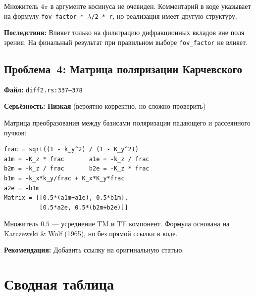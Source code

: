 \documentclass[12pt,a4paper]{article}
\begin{document}
Множитель $4\pi$ в аргументе косинуса не очевиден. Комментарий в коде
указывает на формулу \texttt{fov\_factor * $\lambda$/2 * r}, но реализация
имеет другую структуру.

\textbf{Последствия:} Влияет только на фильтрацию дифракционных вкладов
вне поля зрения. На финальный результат при правильном выборе \texttt{fov\_factor}
не влияет.

\subsection{Проблема~4: Матрица поляризации Карчевского}

\textbf{Файл:} \texttt{diff2.rs:337--378}

\textbf{Серьёзность:} \textcolor{yellow!60!black}{\textbf{Низкая}} (вероятно корректно, но сложно проверить)

Матрица преобразования между базисами поляризации падающего и рассеянного пучков:
\begin{lstlisting}[language={}]
frac = sqrt((1 - k_y^2) / (1 - K_y^2))
a1m = -K_z * frac       a1e = -k_z / frac
b2m = -k_z / frac       b2e = -K_z * frac
b1m = -k_x*k_y/frac + K_x*K_y*frac
a2e = -b1m
Matrix = [[0.5*(a1m+a1e), 0.5*b1m],
          [0.5*a2e, 0.5*(b2m+b2e)]]
\end{lstlisting}

Множитель $0.5$ --- усреднение TM и TE компонент. Формула основана на
Karczewski \& Wolf (1965), но без прямой ссылки в коде.

\textbf{Рекомендация:} Добавить ссылку на оригинальную статью.


\section{Сводная таблица}
\end{document}
